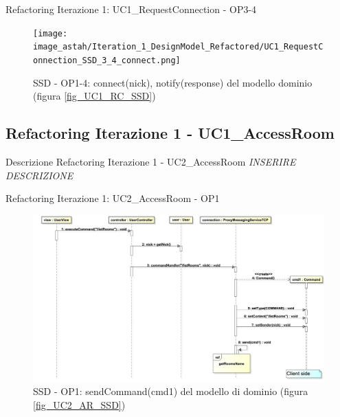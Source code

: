 \documentclass[t]{beamer} %
\begin{document}
\begin{frame} {Refactoring Iterazione 1: UC1\_RequestConnection - OP3-4}
   \begin{figure}
     \texttt{[image: image\_astah/Iteration\_1\_DesignModel\_Refactored/UC1\_RequestConnection\_SSD\_3\_4\_connect.png]}{\centering}
     \caption{SSD - OP1-4: connect(nick), notify(response) del modello dominio (figura \ref{fig_UC1_RC_SSD}) }
     \label{fig_UC1_SSDR_RC_1_4} 
   \end{figure}
\end{frame}

\subsection{Refactoring Iterazione 1 - UC1\_AccessRoom}
\begin{frame} {Descrizione Refactoring Iterazione 1 - UC2\_AccessRoom }
 \emph{INSERIRE DESCRIZIONE}
\end{frame}

\begin{frame} {Refactoring Iterazione 1: UC2\_AccessRoom - OP1}
   \begin{figure}
     \includegraphics[scale=0.21]{image_astah/Iteration_1_DesignModel_Refactored/UC2_AccessRoom_SSD_1_sendCommand.png}{\centering}
     \caption{SSD - OP1: sendCommand(cmd1) del modello di dominio (figura \ref{fig_UC2_AR_SSD}) }
     \label{fig_UC2_SSDR_AC_1} 
   \end{figure}
\end{frame}
\end{document}
